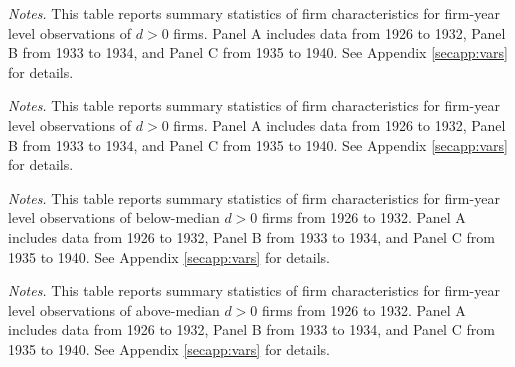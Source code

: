 \begin{table}[p]\centering
\caption{\\ Summary statistics for $d = 0$ firms}\scriptsize
\label{tabapp:sumd0}
  


\vspace*{3mm} \justifying \noindent
\scriptsize{\textit{Notes.} This table reports summary statistics of firm characteristics for firm-year level observations of $d > 0$ firms. Panel A includes data from 1926 to 1932, Panel B from 1933 to 1934, and Panel C from 1935 to 1940. See Appendix \ref{secapp:vars} for details.}
\end{table}

\begin{table}[p]\centering
\caption{\\ NEW: Summary statistics for $d = 0$ firms}\scriptsize
\label{tabapp:sumd0}
  


\vspace*{3mm} \justifying \noindent
\scriptsize{\textit{Notes.} This table reports summary statistics of firm characteristics for firm-year level observations of $d > 0$ firms. Panel A includes data from 1926 to 1932, Panel B from 1933 to 1934, and Panel C from 1935 to 1940. See Appendix \ref{secapp:vars} for details.}
\end{table}

\begin{table}[p]\centering
\caption{\\ Summary statistics for below median $d > 0$ firms}\scriptsize
\label{tabapp:sumdlow}
  


\vspace*{3mm} \justifying \noindent
\scriptsize{\textit{Notes.} This table reports summary statistics of firm characteristics for firm-year level observations of below-median $d > 0$ firms from 1926 to 1932. Panel A includes data from 1926 to 1932, Panel B from 1933 to 1934, and Panel C from 1935 to 1940. See Appendix \ref{secapp:vars} for details.}
\end{table}

\begin{table}[p]\centering
\caption{\\ Summary statistics for above median $d > 0$ firms}\scriptsize
\label{tabapp:sumdhigh}
  


\vspace*{3mm} \justifying \noindent
\scriptsize{\textit{Notes.} This table reports summary statistics of firm characteristics for firm-year level observations of above-median $d > 0$ firms from 1926 to 1932. Panel A includes data from 1926 to 1932, Panel B from 1933 to 1934, and Panel C from 1935 to 1940. See Appendix \ref{secapp:vars} for details.}
\end{table}

